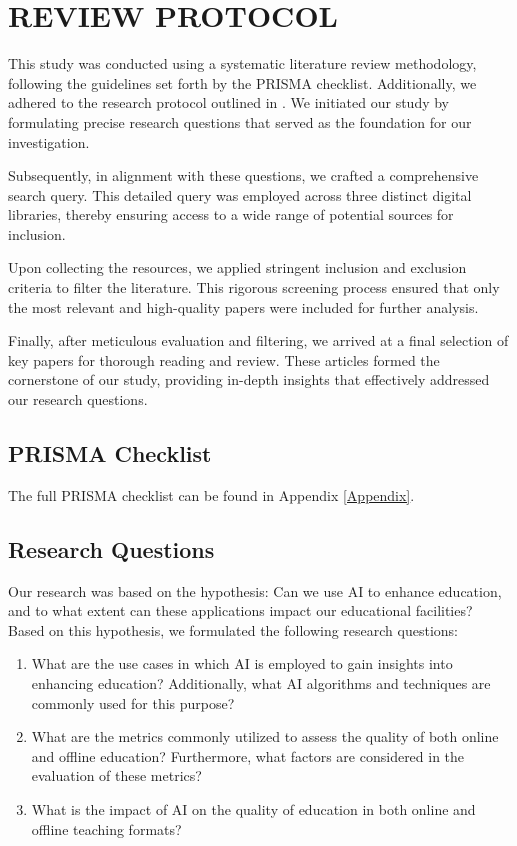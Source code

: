 \section{REVIEW PROTOCOL}
\label{Review PROTOCOL}
This study was conducted using a systematic literature review methodology, following the guidelines set forth by the PRISMA checklist. Additionally, we adhered to the research protocol outlined in \cite{Technologies_for_GQM_Based_Metrics_Recommender_Systems_A_Systematic_Literature_Review}. We initiated our study by formulating precise research questions that served as the foundation for our investigation.

Subsequently, in alignment with these questions, we crafted a comprehensive search query. This detailed query was employed across three distinct digital libraries, thereby ensuring access to a wide range of potential sources for inclusion.

Upon collecting the resources, we applied stringent inclusion and exclusion criteria to filter the literature. This rigorous screening process ensured that only the most relevant and high-quality papers were included for further analysis.

Finally, after meticulous evaluation and filtering, we arrived at a final selection of key papers for thorough reading and review. These articles formed the cornerstone of our study, providing in-depth insights that effectively addressed our research questions.

\subsection{PRISMA Checklist}
The full PRISMA checklist can be found in Appendix \ref{Appendix}.

\subsection{Research Questions}
Our research was based on the hypothesis: Can we use AI to enhance education, and to what extent can these applications impact our educational facilities? Based on this hypothesis, we formulated the following research questions:

\begin{enumerate}
\item[RQ1.] What are the use cases in which AI is employed to gain insights into enhancing education? Additionally, what AI algorithms and techniques are commonly used for this purpose? \label{RQ1}
\item[RQ2.] What are the metrics commonly utilized to assess the quality of both online and offline education? Furthermore, what factors are considered in the evaluation of these metrics?
\item[RQ3.] What is the impact of AI on the quality of education in both online and offline teaching formats?
\end{enumerate}


